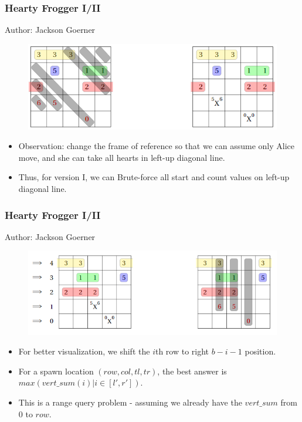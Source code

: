 \documentclass{beamer}
\begin{document}
\begin{frame}
  \frametitle{Hearty Frogger I/II}
Author: Jackson Goerner
\begin{figure}[]
  \centering
  \includegraphics[width=.9\textwidth]{Diagonal.png}  
\end{figure}

\begin{itemize}
  \item Observation: change the frame of reference so that we can assume only Alice move,
  and she can take all hearts in left-up diagonal line.
  \item Thus, for version I, we can Brute-force all start and count values on left-up diagonal line.
\end{itemize}
\end{frame}

\begin{frame}
  \frametitle{Hearty Frogger I/II}
Author: Jackson Goerner
 \begin{figure}[]
  \centering
  \includegraphics[width=.9\textwidth]{Shifting.png}  
\end{figure} 
\begin{itemize}
  \item \small For better visualization, we shift the $i$th row to right $b-i-1$ position.
  \item \small For a spawn location $(row, col, tl, tr)$, the best answer is $max(vert\_sum(i) | i \in [l', r'])$.
  \item \small This is a range query problem - assuming we already have the $vert\_sum$ from $0$ to $row$.
\end{itemize}
\end{frame}
\end{document}
